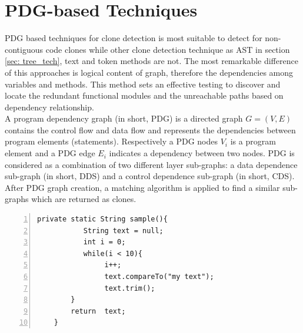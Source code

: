 \documentclass{report}
\begin{document}
\section{PDG-based Techniques}
\label{sec: pdg_tech}
PDG based techniques for clone detection is most suitable to detect for non-contiguous code clones while other clone detection technique as AST in section \ref{sec: tree_tech}, text and token methods are not. The most remarkable difference of this approaches is logical content of graph, therefore the dependencies among variables and methods. This method sets an effective testing to discover and locate the redundant functional modules and the unreachable paths based on dependency relationship.
\\
A program dependency graph (in short, PDG) is a directed graph $ G = (V, E)$ contains the control flow and data flow and represents the dependencies between program elements (statements). Respectively a PDG nodes $V_{i}$ is a program element and a PDG edge $E_{i}$ indicates a dependency between two nodes. PDG is considered as a combination of two different layer sub-graphs: a data dependence sub-graph (in short, DDS) and a control dependence sub-graph (in short, CDS).
After PDG graph creation, a matching algorithm is applied to find a similar sub-graphs which are returned as clones. \newpage

\begin{lstlisting}[numbers=left, numbersep=-5pt, caption=Sample of java method to be extracted into PGD graph.]
    private static String sample(){
 		   String text = null;	
		   int i = 0;
		   while(i < 10){
				i++;
				text.compareTo("my text");
				text.trim();
		}
		return  text;
	} 
\end{lstlisting}
\end{document}
